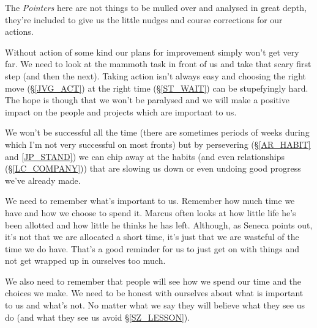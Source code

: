 \cleardoublepage
{\small

The \emph{Pointers} here are not things to be mulled over and analysed in great depth, they're included to give us the little nudges and course corrections for our actions.

Without action of some kind our plans for improvement simply won't get very far. We need to look at the mammoth task in front of us and take that scary first step (and then the next). 
Taking action isn't always easy and choosing the right move (\S \ref{JVG_ACT}) at the right time (\S \ref{ST_WAIT}) can be stupefyingly hard.
The hope is though that we won't be paralysed and we will make a positive impact on the people and projects which are important to us.

We won't be successful all the time (there are sometimes periods of weeks during which I'm not very successful on most fronts) but by persevering (\S \ref{AR_HABIT} and \ref{JP_STAND}) we can chip away at the habits (and even relationships (\S \ref{LC_COMPANY})) that are slowing us down or even undoing good progress we've already made.

We need to remember what's important to us. Remember how much time we have and how we choose to spend it. Marcus often looks at how little life he's been allotted and how little he thinks he has left. Although, as Seneca points out, it's not that we are allocated a short time, it's just that we are wasteful of the time we do have. That's a good reminder for us to just get on with things and not get wrapped up in ourselves too much. 

We also need to remember that people will see how we spend our time and the choices we make. We need to be honest with ourselves about what is important to us and what's not. No matter what we say they will believe what they see us do (and what they see us avoid \S \ref{SZ_LESSON}). 

}
